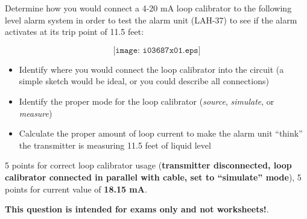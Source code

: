 

Determine how you would connect a 4-20 mA loop calibrator to the following level alarm system in order to test the alarm unit (LAH-37) to see if the alarm activates at its trip point of 11.5 feet:

$$\texttt{[image: i03687x01.eps]}$$

\begin{itemize}
\item{} Identify where you would connect the loop calibrator into the circuit (a simple sketch would be ideal, or you could describe all connections)
\item{} Identify the proper mode for the loop calibrator ({\it source}, {\it simulate}, or {\it measure})
\item{} Calculate the proper amount of loop current to make the alarm unit ``think'' the transmitter is measuring 11.5 feet of liquid level
\end{itemize}








5 points for correct loop calibrator usage ({\bf transmitter disconnected, loop calibrator connected in parallel with cable, set to ``simulate'' mode}), 5 points for current value of {\bf 18.15 mA}.







{\bf This question is intended for exams only and not worksheets!}.



